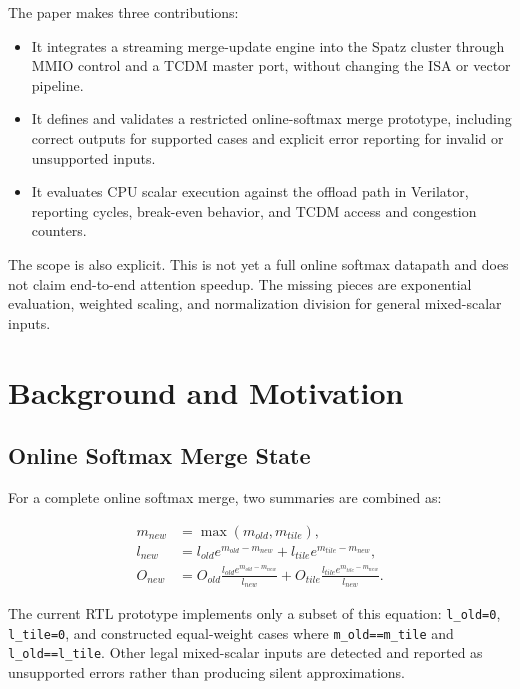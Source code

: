 \documentclass[conference]{IEEEtran}
\begin{document}
The paper makes three contributions:

\begin{itemize}
  \item It integrates a streaming merge-update engine into the Spatz cluster
        through MMIO control and a TCDM master port, without changing the ISA or
        vector pipeline.
  \item It defines and validates a restricted online-softmax merge prototype,
        including correct outputs for supported cases and explicit error
        reporting for invalid or unsupported inputs.
  \item It evaluates CPU scalar execution against the offload path in
        Verilator, reporting cycles, break-even behavior, and TCDM access and
        congestion counters.
\end{itemize}

The scope is also explicit. This is not yet a full online softmax datapath and
does not claim end-to-end attention speedup. The missing pieces are
exponential evaluation, weighted scaling, and normalization division for
general mixed-scalar inputs.

\section{Background and Motivation}

\subsection{Online Softmax Merge State}

For a complete online softmax merge, two summaries are combined as:

\begin{align}
m_{new} &= \max(m_{old}, m_{tile}), \\
l_{new} &= l_{old}e^{m_{old}-m_{new}} +
           l_{tile}e^{m_{tile}-m_{new}}, \\
O_{new} &= O_{old}
          \frac{l_{old}e^{m_{old}-m_{new}}}{l_{new}} +
          O_{tile}
          \frac{l_{tile}e^{m_{tile}-m_{new}}}{l_{new}}.
\end{align}

The current RTL prototype implements only a subset of this equation:
\texttt{l\_old=0}, \texttt{l\_tile=0}, and constructed equal-weight cases where
\texttt{m\_old==m\_tile} and \texttt{l\_old==l\_tile}. Other legal
mixed-scalar inputs are detected and reported as unsupported errors rather
than producing silent approximations.
\end{document}
